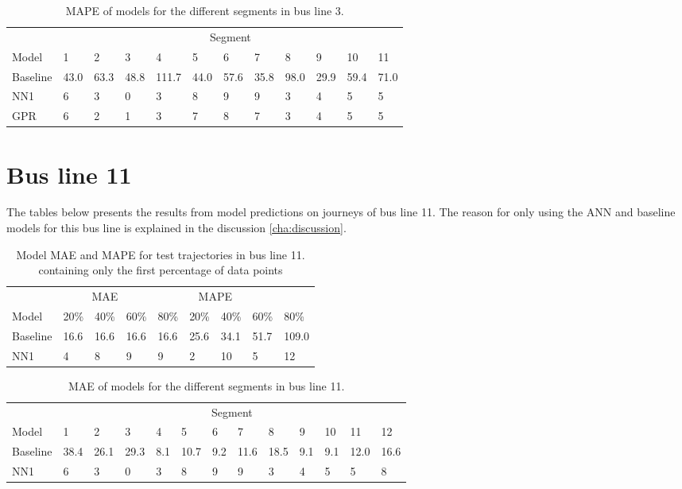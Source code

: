 \begin{table}[H]
  \centering
  \caption{MAPE of models for the different segments in bus line 3.}
  \label{fig:model-mape-of-segs-203}
\begin{tabular}{ l | l | l | l | l | l | l | l | l | l | l | l }
	& \multicolumn{11}{c}{Segment} \\
	Model       & 1 & 2 & 3 & 4 & 5 & 6 & 7 & 8 & 9 & 10 & 11 \\
	\hline
	Baseline  & 43.0 & 63.3 & 48.8 & 111.7 & 44.0 & 57.6 & 35.8 & 98.0 & 29.9 & 59.4  & 71.0 \\
	NN1         & 6 & 3 & 0 & 3 &  8 & 9 &  9 & 3 & 4 & 5  & 5 \\
	GPR         & 6 & 2 & 1 & 3 &  7 & 8 &  7 & 3 & 4 & 5  & 5 \\
\end{tabular}
\end{table}

\section{Bus line 11}
The tables below presents the results from model predictions on journeys of bus line 11. The reason for only using the ANN and baseline models for this bus line is explained in the discussion \ref{cha:discussion}.
\begin{table}[H]
	\centering
	\caption{Model MAE and MAPE for test trajectories in bus line 11. containing only the first percentage of data points}
	\label{tbl:models-mae-and-mape-211}
	\begin{tabular}{l | l | l | l | l || l | l | l | l }
		& \multicolumn{3}{c}{MAE} & \multicolumn{4}{c}{MAPE} \\
		Model      & 20\% & 40\% & 60\% & 80\% & 20\% & 40\% & 60\% & 80\% \\
		\hline
		Baseline & 16.6 & 16.6 & 16.6 & 16.6  & 25.6 & 34.1 & 51.7 & 109.0 \\
		NN1        & 4 &  8 & 9 &  9  & 2 & 10 & 5 & 12 \\
	\end{tabular}
\end{table}

\begin{table}[H]
	\centering
	\caption{MAE of models for the different segments in bus line 11.}
	\label{tbl:model-mae-of-segs-211}
	\begin{tabular}{ l | l | l | l | l | l | l | l | l | l | l | l | l}
		& \multicolumn{12}{c}{Segment} \\
		Model       & 1 & 2 & 3 & 4 & 5 & 6 & 7 & 8 & 9 & 10 & 11 & 12 \\
		\hline
		Baseline  & 38.4 & 26.1 & 29.3 & 8.1 & 10.7 & 9.2 & 11.6 & 18.5 & 9.1 & 9.1  & 12.0 & 16.6 \\
		NN1         & 6 & 3 & 0 & 3 &  8 & 9 &  9 & 3 & 4 & 5  & 5 & 8\\
	\end{tabular}
\end{table}


